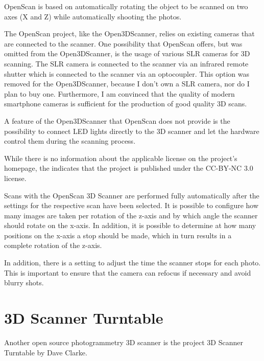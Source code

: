 OpenScan is based on automatically rotating the object to be scanned on two axes (X and Z) while automatically shooting the photos.%

The OpenScan project, like the Open3DScanner, relies on existing cameras that are connected to the scanner. One possibility that OpenScan offers, but was omitted from the Open3DScanner, is the usage of various SLR cameras for 3D scanning. The SLR camera is connected to the scanner via an infrared remote shutter which is connected to the scanner via an optocoupler. This option was removed for the Open3DScanner, because I don't own a SLR camera, nor do I plan to buy one. Furthermore, I am convinced that the quality of modern smartphone cameras is sufficient for the production of good quality 3D scans.%

A feature of the Open3DScanner that OpenScan does not provide is the possibility to connect LED lights directly to the 3D scanner and let the hardware control them during the scanning process.%

While there is no information about the applicable license on the project's homepage, the  indicates that the project is published under the CC-BY-NC 3.0 license.%

Scans with the OpenScan 3D Scanner are performed fully automatically after the settings for the respective scan have been selected. It is possible to configure how many images are taken per rotation of the z-axis and by which angle the scanner should rotate on the x-axis. In addition, it is possible to determine at how many positions on the x-axis a stop should be made, which in turn results in a complete rotation of the z-axis.%

In addition, there is a setting to adjust the time the scanner stops for each photo. This is important to ensure that the camera can refocus if necessary and avoid blurry shots.%

%

\section{3D Scanner Turntable}%
\label{s:3dTurn}%
Another open source photogrammetry 3D scanner is the project 3D Scanner Turntable by Dave Clarke.%


